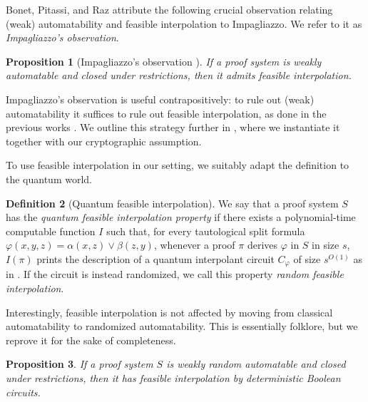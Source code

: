 \documentclass[11pt]{article}
\theoremstyle{definition}
\newtheorem{definition}{Definition}[section]
\theoremstyle{plain}
\newtheorem{proposition}[definition]{Proposition}
\theoremstyle{remark}
\begin{document}
Bonet, Pitassi, and Raz attribute the following crucial observation relating (weak) automatability and feasible interpolation to Impagliazzo. We refer to it as \emph{Impagliazzo's observation}.

\begin{proposition}[Impagliazzo's observation {\autocite[Thm. 1.1]{BPR1997}}]
    If a proof system is weakly automatable and closed under restrictions, then it admits feasible interpolation.
\end{proposition}

Impagliazzo's observation is useful contrapositively: to rule out (weak) automatability it suffices to rule out feasible interpolation, as done in the previous works \cite{KP98, BPR1997}. We outline this strategy further in , where we instantiate it together with our cryptographic assumption.

To use feasible interpolation in our setting, we suitably adapt the definition to the quantum world.

\begin{definition}[Quantum feasible interpolation]
\label{def:qfi}
We say that a proof system $S$ has the \emph{quantum feasible interpolation property} if there exists a polynomial-time computable function $I$ such that, for every tautological split formula $\varphi(x, y, z) = \alpha(x, z) \lor \beta(z, y)$, whenever a proof $\pi$ derives $\varphi$ in $S$ in size $s$, $I(\pi)$ prints the description of a quantum interpolant circuit $C_\varphi$ of size $s^{O(1)}$ as in . If the circuit is instead randomized, we call this property \emph{random feasible interpolation}.
\end{definition}

Interestingly, feasible interpolation is not affected by moving from classical automatability to randomized automatability. This is essentially folklore, but we reprove it for the sake of completeness.

\begin{proposition}
\label{prop:rand-impa}
If a proof system $S$ is weakly random automatable and closed under restrictions, then it has feasible interpolation by deterministic Boolean circuits.
\end{proposition}
\end{document}
